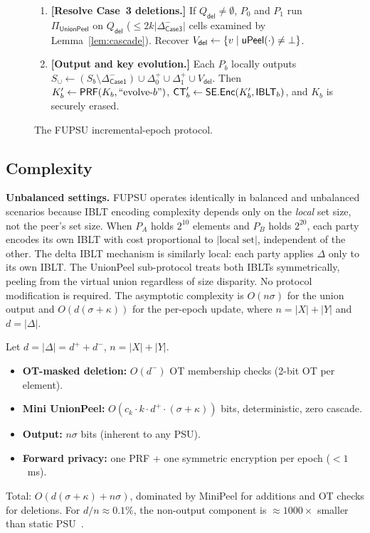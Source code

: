 \begin{figure}[t]
{\begin{minipage}{\dimexpr\textwidth-2\fboxsep-2\fboxrule\relax}
\begin{enumerate}
\item \textbf{[Resolve Case~3 deletions.]}
If $Q_{\mathsf{del}} \neq \emptyset$, $P_0$ and $P_1$ run $\Pi_{\mathsf{UnionPeel}}$ on $Q_{\mathsf{del}}$
($\leq 2k|\Delta^-_{\mathsf{Case3}}|$ cells examined by Lemma~\ref{lem:cascade}).
Recover $V_{\mathsf{del}} \leftarrow \{ v \mid \mathsf{uPeel}(\cdot) \neq \bot \}$.

\item \textbf{[Output and key evolution.]}
Each $P_b$ locally outputs
$S_{\cup} \leftarrow (S_{b} \setminus \Delta^-_{\mathsf{Case1}}) \cup
\Delta^+_0 \cup \Delta^+_1 \cup V_{\mathsf{del}}$.
Then $K'_{b} \leftarrow \mathsf{PRF}(K_{b}, \text{``evolve-}b\text{''})$,
$\mathsf{CT}'_{b} \leftarrow \mathsf{SE}.\mathsf{Enc}(K'_{b}, \mathsf{IBLT}_{b})$,
and $K_{b}$ is securely erased.
\end{enumerate}


\smallskip
\end{minipage}}
\caption{The FUPSU incremental-epoch protocol.}
\label{fig:protocol}
\end{figure}

\subsection{Complexity}\label{sec:complexity}

\textbf{Unbalanced settings.} FUPSU operates identically in balanced and
unbalanced scenarios because IBLT encoding complexity depends only on the
\emph{local} set size, not the peer's set size. When $P_A$ holds $2^{10}$
elements and $P_B$ holds $2^{20}$, each party encodes its own IBLT with cost
proportional to $|\text{local set}|$, independent of the other. The delta
IBLT mechanism is similarly local: each party applies $\Delta$ only to its
own IBLT. The UnionPeel sub-protocol treats both IBLTs symmetrically,
peeling from the virtual union regardless of size disparity. No protocol
modification is required. The asymptotic complexity is $O(n\sigma)$ for the
union output and $O(d(\sigma + \kappa))$ for the per-epoch update, where
$n = |X| + |Y|$ and $d = |\Delta|$.

Let $d = |\Delta| = d^+ + d^-$, $n = |X| + |Y|$.
\begin{itemize}
\item \textbf{OT-masked deletion:} $O(d^-)$ OT membership checks (2-bit OT per
element).

\item \textbf{Mini UnionPeel:} $O(c_k \cdot k \cdot d^+ \cdot (\sigma + \kappa))$ bits,
deterministic, zero cascade.
\item \textbf{Output:} $n\sigma$ bits (inherent to any PSU).
\item \textbf{Forward privacy:} one PRF + one symmetric encryption per epoch ($<1$~ms).
\end{itemize}
Total: $O(d(\sigma + \kappa) + n\sigma)$, dominated by MiniPeel for additions
and OT checks for deletions. For $d/n \approx 0.1\%$, the non-output
component is $\approx 1000\times$ smaller than static PSU~\cite{PT26}.

